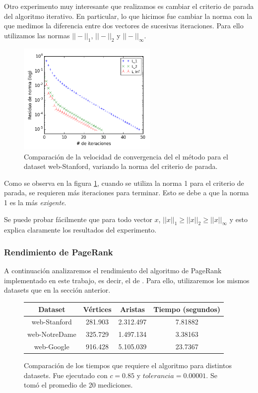 Otro experimento muy interesante que realizamos es cambiar el criterio de parada del algoritmo iterativo. En particular, lo que hicimos fue cambiar la norma con la que medimos la diferencia entre dos vectores de sucesivas iteraciones. Para ello utilizamos las normas $||-||_1$, $||-||_2$ y $||-||_{\infty}$.

\begin{figure}[H]
\centering

    \includegraphics[width=0.6\textwidth]{imgs/convergencia-norma.png}
  \caption{\footnotesize{Comparación de la velocidad de convergencia del el método para el dataset web-Stanford, variando la norma del criterio de parada.}}
  \label{fig:conv-norma}
\end{figure}

Como se observa en la figura \ref{fig:conv-norma}, cuando se utiliza la norma 1 para el criterio de parada, se requieren más iteraciones para terminar. Esto se debe a que la norma 1 es la más \emph{exigente}. 

Se puede probar fácilmente que para todo vector $x$, $||x||_1 \geq ||x||_2 \geq ||x||_{\infty}$ y esto explica claramente los resultados del experimento.



\subsubsection{Rendimiento de PageRank}
A continuación analizaremos el rendimiento del algoritmo de PageRank implementado en este trabajo, es decir, el de \cite{Kamvar2003}. Para ello, utilizaremos los mismos datasets que en la sección anterior.

\begin{figure}[H]
\centering
\begin{tabular}{| c | c | c | c |}
  \hline
  Dataset & Vértices & Aristas & Tiempo (segundos) \\ \hline \hline
  web-Stanford & 281.903 & 2.312.497 & 7.81882 \\ \hline
  web-NotreDame & 325.729 & 1.497.134 & 3.38163 \\ \hline
  web-Google & 916.428 & 5.105.039 & 23.7367 \\ \hline
\end{tabular}

  \caption{\footnotesize{Comparación de los tiempos que requiere el algoritmo para distintos datasets. Fue ejecutado con $c = 0.85$ y $tolerancia = 0.00001$.  Se tomó el promedio de 20 mediciones.}}
  \label{fig:tiempos1}
\end{figure}

